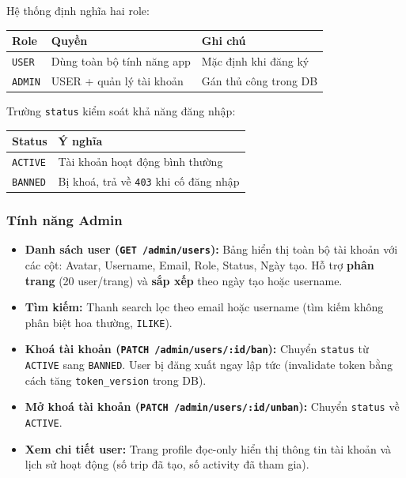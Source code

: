 \documentclass[12pt,a4paper]{article}
\begin{document}
Hệ thống định nghĩa hai role:

\begin{center}
\begin{tabular}{lll}
  \toprule
  \textbf{Role} & \textbf{Quyền} & \textbf{Ghi chú} \\
  \midrule
  \texttt{USER}  & Dùng toàn bộ tính năng app & Mặc định khi đăng ký \\
  \texttt{ADMIN} & USER + quản lý tài khoản   & Gán thủ công trong DB \\
  \bottomrule
\end{tabular}
\end{center}

Trường \texttt{status} kiểm soát khả năng đăng nhập:

\begin{center}
\begin{tabular}{ll}
  \toprule
  \textbf{Status} & \textbf{Ý nghĩa} \\
  \midrule
  \texttt{ACTIVE} & Tài khoản hoạt động bình thường \\
  \texttt{BANNED} & Bị khoá, trả về \texttt{403} khi cố đăng nhập \\
  \bottomrule
\end{tabular}
\end{center}

\subsubsection{Tính năng Admin}

\begin{itemize}
  \item \textbf{Danh sách user (\texttt{GET /admin/users}):} Bảng hiển
        thị toàn bộ tài khoản với các cột: Avatar, Username, Email, Role,
        Status, Ngày tạo. Hỗ trợ \textbf{phân trang} (20 user/trang) và
        \textbf{sắp xếp} theo ngày tạo hoặc username.
  \item \textbf{Tìm kiếm:} Thanh search lọc theo email hoặc username
        (tìm kiếm không phân biệt hoa thường, \texttt{ILIKE}).
  \item \textbf{Khoá tài khoản (\texttt{PATCH /admin/users/:id/ban}):}
        Chuyển \texttt{status} từ \texttt{ACTIVE} sang \texttt{BANNED}.
        User bị đăng xuất ngay lập tức (invalidate token bằng cách tăng
        \texttt{token\_version} trong DB).
  \item \textbf{Mở khoá tài khoản (\texttt{PATCH /admin/users/:id/unban}):}
        Chuyển \texttt{status} về \texttt{ACTIVE}.
  \item \textbf{Xem chi tiết user:} Trang profile đọc-only hiển thị
        thông tin tài khoản và lịch sử hoạt động (số trip đã tạo, số
        activity đã tham gia).
\end{itemize}
\end{document}

